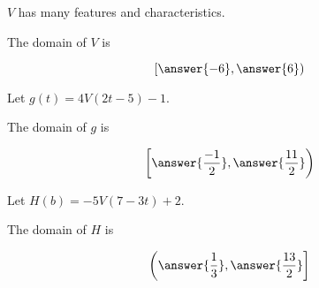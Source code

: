 \documentclass{ximera}
\begin{document}
\begin{exercise}
$V$ has many features and characteristics. \\






\begin{question}


The domain of $V$ is 

\[
\left[ \answer{-6}, \answer{6} \right)
\]


\end{question}








\begin{question}



Let $g(t) = 4 V(2t - 5) - 1$.



The domain of $g$ is 

\[
\left[ \answer{\frac{-1}{2}}, \answer{\frac{11}{2}} \right)
\]




\end{question}












\begin{question}



Let $H(b) = -5 V(7 - 3t) + 2$.



The domain of $H$ is 

\[
\left( \answer{\frac{1}{3}}, \answer{\frac{13}{2}} \right]
\]




\end{question}









\end{exercise}
\end{document}
